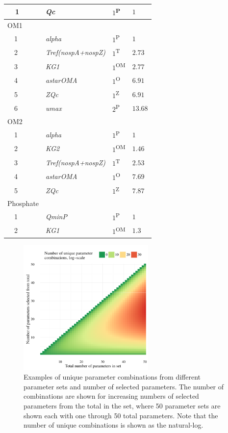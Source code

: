 \documentclass[letterpaper,12pt,oneside]{article}\usepackage[]{graphicx}\usepackage[]{color}
\begin{document}
\begin{table}[!tbp]
{\begin{center}
\begin{tabular}{llll}
~~1&\footnotesize{\textit{Qc}}&$1$\textsuperscript{P}&$1$\tabularnewline
\hline
{OM1}&&&\tabularnewline
~~1&\footnotesize{\textit{alpha}}&$1$\textsuperscript{P}&$1$\tabularnewline
~~2&\footnotesize{\textit{Tref(nospA+nospZ)}}&$1$\textsuperscript{T}&$2.73$\tabularnewline
~~3&\footnotesize{\textit{KG1}}&$1$\textsuperscript{OM}&$2.77$\tabularnewline
~~4&\footnotesize{\textit{astarOMA}}&$1$\textsuperscript{O}&$6.91$\tabularnewline
~~5&\footnotesize{\textit{ZQc}}&$1$\textsuperscript{Z}&$6.91$\tabularnewline
~~6&\footnotesize{\textit{umax}}&$2$\textsuperscript{P}&$13.68$\tabularnewline
\hline
{OM2}&&&\tabularnewline
~~1&\footnotesize{\textit{alpha}}&$1$\textsuperscript{P}&$1$\tabularnewline
~~2&\footnotesize{\textit{KG2}}&$1$\textsuperscript{OM}&$1.46$\tabularnewline
~~3&\footnotesize{\textit{Tref(nospA+nospZ)}}&$1$\textsuperscript{T}&$2.53$\tabularnewline
~~4&\footnotesize{\textit{astarOMA}}&$1$\textsuperscript{O}&$7.69$\tabularnewline
~~5&\footnotesize{\textit{ZQc}}&$1$\textsuperscript{Z}&$7.87$\tabularnewline
\hline
{Phosphate}&&&\tabularnewline
~~1&\footnotesize{\textit{QminP}}&$1$\textsuperscript{P}&$1$\tabularnewline
~~2&\footnotesize{\textit{KG1}}&$1$\textsuperscript{OM}&$1.3$\tabularnewline
\hline
\end{tabular}\end{center}}

\end{table}



\clearpage


\begin{figure}[!ht]

{\centering \includegraphics[width=0.6\textwidth]{figs/combnex-1} 

}

\caption[Examples of unique parameter combinations from different parameter sets and number of selected parameters]{Examples of unique parameter combinations from different parameter sets and number of selected parameters.  The number of combinations are shown for increasing numbers of selected parameters from the total in the set, where 50 parameter sets are shown each with one through 50 total parameters. Note that the number of unique combinations is shown as the natural-log.}\label{fig:combnex}
\end{figure}
\end{document}
